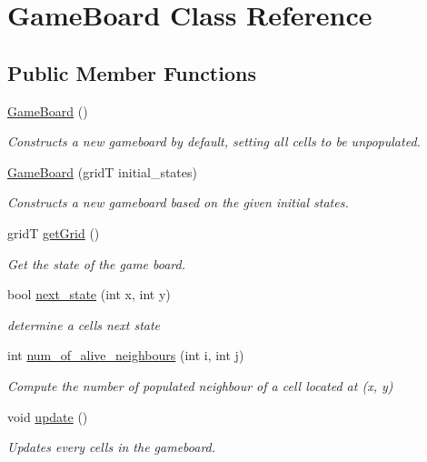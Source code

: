 \hypertarget{class_game_board}{}\section{Game\+Board Class Reference}
\label{class_game_board}
\subsection*{Public Member Functions}
\begin{DoxyCompactItemize}
\item 
\mbox{\hyperlink{class_game_board_ac622cadcc81b3ffb71d8feb4506c04ac}{Game\+Board}} ()
\begin{DoxyCompactList}\small\item\em Constructs a new gameboard by default, setting all cells to be unpopulated. \end{DoxyCompactList}\item 
\mbox{\hyperlink{class_game_board_a82ca7599d8ef010f04cde54441570ee4}{Game\+Board}} (gridT initial\+\_\+states)
\begin{DoxyCompactList}\small\item\em Constructs a new gameboard based on the given initial states. \end{DoxyCompactList}\item 
gridT \mbox{\hyperlink{class_game_board_a71d1ef6a134272a74bf9b9e2ada64d35}{get\+Grid}} ()
\begin{DoxyCompactList}\small\item\em Get the state of the game board. \end{DoxyCompactList}\item 
bool \mbox{\hyperlink{class_game_board_a33120884bc74e591c5006c80b17dfcf1}{next\+\_\+state}} (int x, int y)
\begin{DoxyCompactList}\small\item\em determine a cell\textquotesingle{}s next state \end{DoxyCompactList}\item 
int \mbox{\hyperlink{class_game_board_a274219c41327d6fe34ca7b50c5fa8284}{num\+\_\+of\+\_\+alive\+\_\+neighbours}} (int i, int j)
\begin{DoxyCompactList}\small\item\em Compute the number of populated neighbour of a cell located at (x, y) \end{DoxyCompactList}\item 
void \mbox{\hyperlink{class_game_board_a5dc2bdedeaa9d70bb4a1c35a5a257d91}{update}} ()
\begin{DoxyCompactList}\small\item\em Updates every cells in the gameboard. \end{DoxyCompactList}\end{DoxyCompactItemize}


